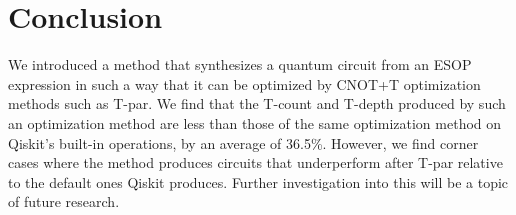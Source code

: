 \section{Conclusion}
\label{Conc}

We introduced a method that synthesizes a quantum circuit from an ESOP expression in such a way that it can be optimized by CNOT+T optimization methods such as T-par. We find that the T-count and T-depth produced by such an optimization method are less than those of the same optimization method on Qiskit's built-in operations, by an average of 36.5\%. However, we find corner cases where the method produces circuits that underperform after T-par relative to the default ones Qiskit produces. Further investigation into this will be a topic of future research.
